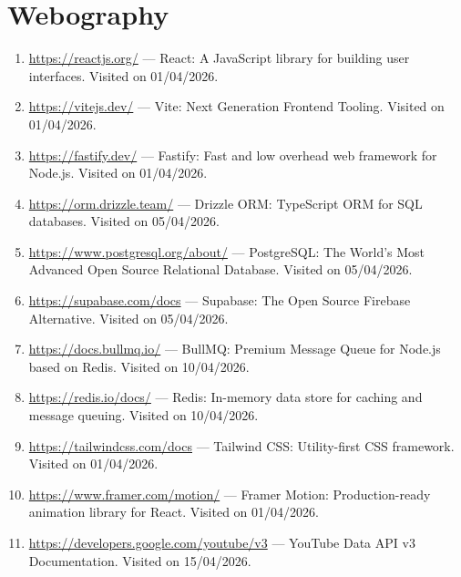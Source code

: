 \chapter*{Webography}

\begin{enumerate}
    \item \url{https://reactjs.org/} --- React: A JavaScript library for building user interfaces. Visited on 01/04/2026.
    
    \item \url{https://vitejs.dev/} --- Vite: Next Generation Frontend Tooling. Visited on 01/04/2026.
    
    \item \url{https://fastify.dev/} --- Fastify: Fast and low overhead web framework for Node.js. Visited on 01/04/2026.
    
    \item \url{https://orm.drizzle.team/} --- Drizzle ORM: TypeScript ORM for SQL databases. Visited on 05/04/2026.
    
    \item \url{https://www.postgresql.org/about/} --- PostgreSQL: The World's Most Advanced Open Source Relational Database. Visited on 05/04/2026.
    
    \item \url{https://supabase.com/docs} --- Supabase: The Open Source Firebase Alternative. Visited on 05/04/2026.
    
    \item \url{https://docs.bullmq.io/} --- BullMQ: Premium Message Queue for Node.js based on Redis. Visited on 10/04/2026.
    
    \item \url{https://redis.io/docs/} --- Redis: In-memory data store for caching and message queuing. Visited on 10/04/2026.
    
    \item \url{https://tailwindcss.com/docs} --- Tailwind CSS: Utility-first CSS framework. Visited on 01/04/2026.
    
    \item \url{https://www.framer.com/motion/} --- Framer Motion: Production-ready animation library for React. Visited on 01/04/2026.
    
    \item \url{https://developers.google.com/youtube/v3} --- YouTube Data API v3 Documentation. Visited on 15/04/2026.
    

\end{enumerate}
